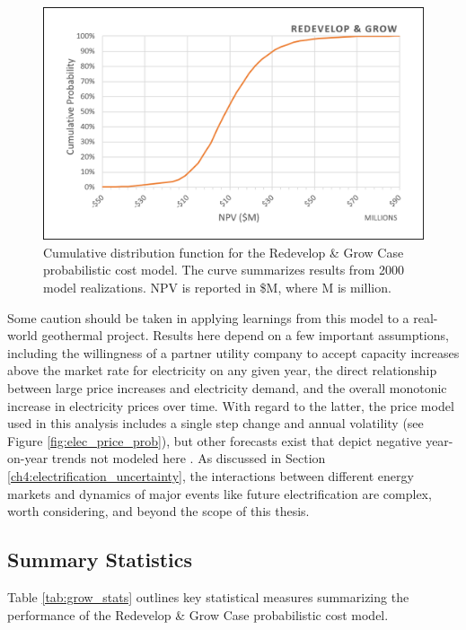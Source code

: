 \begin{figure}[!htp]
\centering
\includegraphics[width=.85\textwidth]{templates/images/Figure-Grow_Case_CDF.png}
\caption[Redevelop \& Grow Case CDF]{Cumulative distribution function for the Redevelop \& Grow Case probabilistic cost model. The curve summarizes results from 2000 model realizations. NPV is reported in \$M, where M is million.}
\label{fig:grow_case_cdf}
\end{figure}

Some caution should be taken in applying learnings from this model to a real-world geothermal project. Results here depend on a few important assumptions, including the willingness of a partner utility company to accept capacity increases above the market rate for electricity on any given year, the direct relationship between large price increases and electricity demand, and the overall monotonic increase in electricity prices over time. With regard to the latter, the price model used in this analysis includes a single step change and annual volatility (see Figure \ref{fig:elec_price_prob}), but other forecasts exist that depict negative year-on-year trends not modeled here \citep{murphy_electrification_2021}. As discussed in Section \ref{ch4:electrification_uncertainty}, the interactions between different energy markets and dynamics of major events like future electrification are complex, worth considering, and beyond the scope of this thesis. 

\subsection{Summary Statistics}
\label{ch6:grow_stats}

Table \ref{tab:grow_stats} outlines key statistical measures summarizing the performance of the Redevelop \& Grow Case probabilistic cost model.

